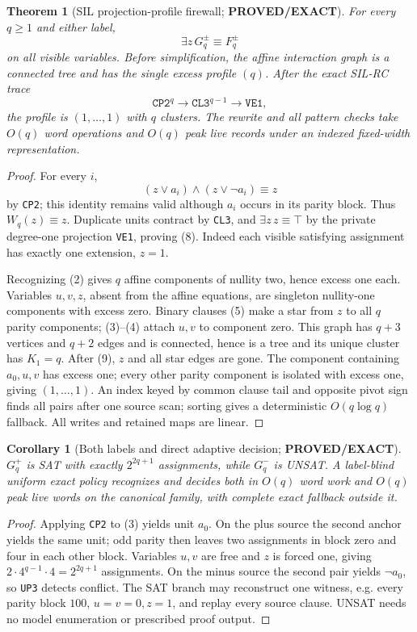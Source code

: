 \documentclass[11pt]{article}
\newtheorem{theorem}{Theorem}
\newtheorem{corollary}{Corollary}
\newcommand{\PROVED}{\textbf{PROVED/EXACT}}
\begin{document}
\begin{theorem}[SIL projection-profile firewall; \PROVED]\label{th:firewall}
For every $q\ge1$ and either label,
\[
\exists z\,G_q^\pm\equiv F_q^\pm                                  \tag{8}
\]
on all visible variables.  Before simplification, the affine interaction
graph is a connected tree and has the single excess profile $(q)$.  After
the exact SIL-RC trace
\[
\texttt{CP2}^q\to\texttt{CL3}^{q-1}\to\texttt{VE1},                \tag{9}
\]
the profile is $(1,\ldots,1)$ with $q$ clusters.  The rewrite and all pattern
checks take $O(q)$ word operations and $O(q)$ peak live records under an
indexed fixed-width representation.
\end{theorem}
\begin{proof}
For every $i$,
\[
(z\vee a_i)\land(z\vee\neg a_i)\equiv z                           \tag{10}
\]
by \texttt{CP2}; this identity remains valid although $a_i$ occurs in its
parity block.  Thus $W_q(z)\equiv z$.  Duplicate units contract by
\texttt{CL3}, and $\exists z\,z\equiv\top$ by the private degree-one
projection \texttt{VE1}, proving (8).  Indeed each visible satisfying
assignment has exactly one extension, $z=1$.

Recognizing (2) gives $q$ affine components of nullity two, hence excess one
each.  Variables $u,v,z$, absent from the affine equations, are singleton
nullity-one components with excess zero.  Binary clauses (5) make a star from
$z$ to all $q$ parity components; (3)--(4) attach $u,v$ to component zero.
This graph has $q+3$ vertices and $q+2$ edges and is connected, hence is a
tree and its unique cluster has $K_1=q$.  After (9), $z$ and all star edges
are gone.  The component containing $a_0,u,v$ has excess one; every other
parity component is isolated with excess one, giving $(1,\ldots,1)$.
An index keyed by common clause tail and opposite pivot sign finds all pairs
after one source scan; sorting gives a deterministic $O(q\log q)$ fallback.
All writes and retained maps are linear.
\end{proof}

\begin{corollary}[Both labels and direct adaptive decision; \PROVED]
$G_q^+$ is SAT with exactly $2^{2q+1}$ assignments, while $G_q^-$ is UNSAT.
A label-blind uniform exact policy recognizes and decides both in $O(q)$ word
work and $O(q)$ peak live words on the canonical family, with complete exact
fallback outside it.
\end{corollary}
\begin{proof}
Applying \texttt{CP2} to (3) yields unit $a_0$.  On the plus source the
second anchor yields the same unit; odd parity then leaves two assignments in
block zero and four in each other block.  Variables $u,v$ are free and $z$ is
forced one, giving $2\cdot4^{q-1}\cdot4=2^{2q+1}$ assignments.  On the minus
source the second pair yields $\neg a_0$, so \texttt{UP3} detects conflict.
The SAT branch may reconstruct one witness, e.g. every parity block $100$,
$u=v=0,z=1$, and replay every source clause.  UNSAT needs no model enumeration
or prescribed proof output.
\end{proof}
\end{document}
